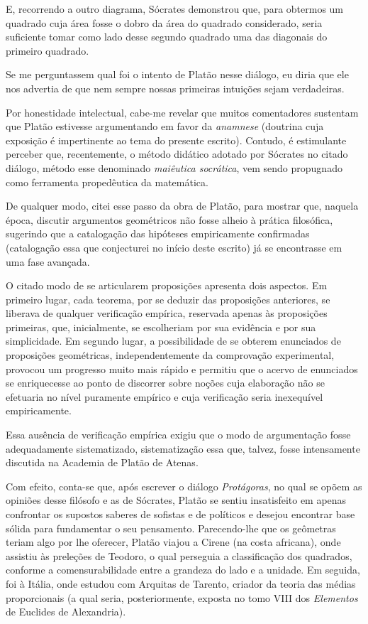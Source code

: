 \documentclass{hipatia}
\begin{document}
E, recorrendo a outro diagrama, Sócrates demonstrou que, para obtermos um quadrado cuja área fosse o dobro da área do quadrado considerado, seria suficiente tomar como lado desse segundo quadrado uma das diagonais do primeiro quadrado.

Se me perguntassem qual foi o intento de Platão nesse diálogo, eu diria que ele nos advertia de que nem sempre nossas primeiras intuições sejam verdadeiras. 

Por honestidade intelectual, cabe-me revelar que muitos comentadores sustentam que Platão estivesse argumentando em favor da \emph{anamnese}  (doutrina cuja exposição é impertinente ao tema do presente escrito). Contudo, é estimulante perceber que, recentemente, o método didático adotado por Sócrates no citado diálogo, método esse denominado \emph{maiêutica socrática}, vem sendo propugnado como ferramenta propedêutica da matemática. \cite[p. 8]{winter1989}

De qualquer modo, citei esse passo da obra de Platão, para mostrar que, naquela época, discutir argumentos geométricos não fosse alheio à prática filosófica, sugerindo que a catalogação das hipóteses empiricamente confirmadas  (catalogação essa que conjecturei no início deste escrito)  já se encontrasse em uma fase avançada.

O citado modo de se articularem proposições apresenta dois aspectos. Em primeiro lugar, cada teorema, por se deduzir das proposições anteriores, se liberava de qualquer verificação empírica, reservada apenas às proposições primeiras, que, inicialmente, se escolheriam por sua evidência e por sua simplicidade. Em segundo lugar, a possibilidade de se obterem enunciados de proposições geométricas, independentemente da comprovação experimental, provocou um progresso muito mais rápido e permitiu que o acervo de enunciados se enriquecesse ao ponto de discorrer sobre noções cuja elaboração não se efetuaria no nível puramente empírico e cuja verificação seria inexequível empiricamente.  \cite[p. 120]{kagan1986}\cite[p. 12]{smogorzhevski1976}  

Essa ausência de verificação empírica exigiu que o modo de argumentação fosse adequadamente sistematizado, sistematização essa que, talvez, fosse intensamente discutida na Academia de Platão de Atenas.

Com efeito, conta-se que, após escrever o diálogo \emph{Protágoras}, no qual se opõem as opiniões desse filósofo e as de Sócrates, Platão se sentiu insatisfeito em apenas confrontar os supostos saberes de sofistas e de políticos e desejou encontrar base sólida para fundamentar o seu pensamento. Parecendo-lhe que os geômetras teriam algo por lhe oferecer, Platão viajou a Cirene (na costa africana), onde assistiu às preleções de Teodoro, o qual perseguia a classificação dos quadrados, conforme a comensurabilidade entre a grandeza do lado e a unidade. Em seguida, foi à Itália, onde estudou com Arquitas de Tarento, criador da teoria das médias proporcionais (a qual seria, posteriormente, exposta no tomo VIII dos \emph{Elementos} de Euclides de Alexandria).  \cite[p. 103]{laercio1988}\cite[p. 170, 182]{mosterin1984}\cite[p. 209]{russell1945} 
\end{document}
